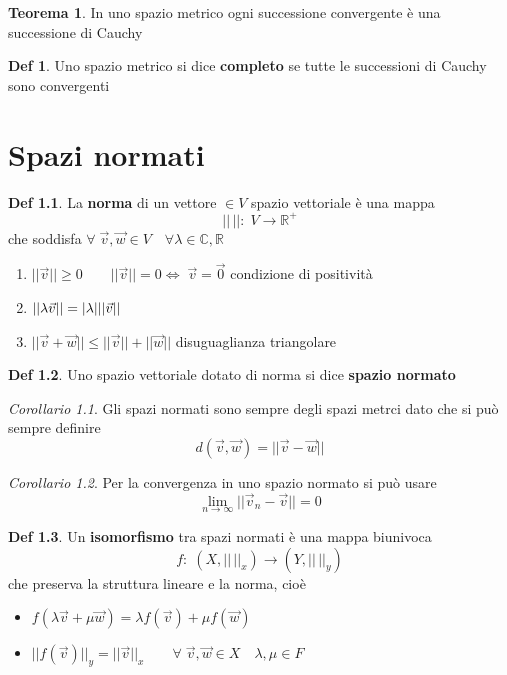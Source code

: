 \documentclass[a4paper,11pt]{report}
\theoremstyle{remark}
\newtheorem*{coro}{Corollario}
\theoremstyle{definition}
\newtheorem*{teo}{Teorema}
\newtheorem*{Def}{Def}
\newcommand{\C}{\mathbb{C}}
\newcommand{\R}{\mathbb{R}}
\DeclarePairedDelimiter{\abs}{\lvert}{\rvert}
\begin{document}
\begin{teo}
	In uno spazio metrico ogni successione convergente è una successione di Cauchy 
\end{teo}

\begin{Def}
	Uno spazio metrico si dice \textbf{completo} se tutte le successioni di Cauchy sono convergenti 
\end{Def}

\chapter{Spazi normati}

\begin{Def}
	La \textbf{norma} di un vettore $\in V$ spazio vettoriale è una mappa
	\[||\,||: \; V \to \R^+\]
	che soddisfa $\forall \; \vec{v},\vec{w}\in V \quad \forall\lambda \in \C,\R$
	\begin{enumerate}
		\item $||\vec{v}||\ge 0 \qquad ||{\vec{v}}||=0 \iff \; \vec{v} = \vec{0}$ \qquad condizione di positività
	  	\item $||\lambda\vec{v}|| = \abs{\lambda}||\vec{v}||$
    \item $||\vec{v}+\vec{w}|| \le ||\vec{v}|| + ||\vec{w}||$ \qquad disuguaglianza triangolare
	\end{enumerate}
\end{Def}

\begin{Def}
	Uno spazio vettoriale dotato di norma si dice \textbf{spazio normato}
\end{Def}

\begin{coro}
	Gli spazi normati sono sempre degli spazi metrci dato che si può sempre definire
	\[d(\vec{v},\vec{w})= ||\vec{v}-\vec{w}||\]
\end{coro}

\begin{coro}
	Per la convergenza in uno spazio normato si può usare 
	\[\lim_{n\to\infty} ||\vec{v}_n - \vec{v}|| =0\]
\end{coro}

\begin{Def}
	Un \textbf{isomorfismo} tra spazi normati è una mappa biunivoca
	\[f: \; (X, ||\,||_x) \to (Y, ||\, ||_y)\]
	che preserva la struttura lineare e la norma, cioè
	\begin{itemize}
		\item $f(\lambda\vec{v}+\mu\vec{w}) = \lambda f(\vec{v})+ \mu f(\vec{w})$ 
  \item $||f(\vec{v})||_y = ||\vec{v}||_x \qquad \forall \;\vec{v},\vec{w} \in X \quad \lambda,\mu \in F$
	\end{itemize}
\end{Def}
\end{document}
